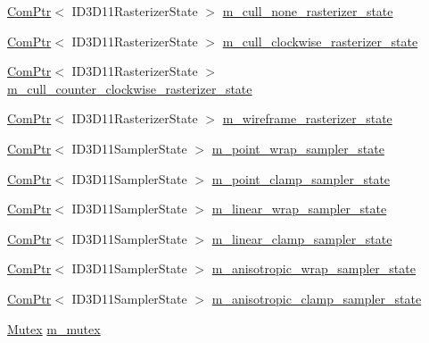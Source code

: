 \begin{DoxyCompactItemize}
\item 
\hyperlink{namespacemage_ae74f374780900893caa5555d1031fd79}{Com\+Ptr}$<$ I\+D3\+D11\+Rasterizer\+State $>$ \hyperlink{structmage_1_1_rendering_state_cache_a3801dbdf6386c9534123d695cbde47c7}{m\+\_\+cull\+\_\+none\+\_\+rasterizer\+\_\+state}
\item 
\hyperlink{namespacemage_ae74f374780900893caa5555d1031fd79}{Com\+Ptr}$<$ I\+D3\+D11\+Rasterizer\+State $>$ \hyperlink{structmage_1_1_rendering_state_cache_a4194ce92cb7cccd2ae219e13eaf7cfdc}{m\+\_\+cull\+\_\+clockwise\+\_\+rasterizer\+\_\+state}
\item 
\hyperlink{namespacemage_ae74f374780900893caa5555d1031fd79}{Com\+Ptr}$<$ I\+D3\+D11\+Rasterizer\+State $>$ \hyperlink{structmage_1_1_rendering_state_cache_a825b91a2cb5ab76375d1ebebe7a0ef74}{m\+\_\+cull\+\_\+counter\+\_\+clockwise\+\_\+rasterizer\+\_\+state}
\item 
\hyperlink{namespacemage_ae74f374780900893caa5555d1031fd79}{Com\+Ptr}$<$ I\+D3\+D11\+Rasterizer\+State $>$ \hyperlink{structmage_1_1_rendering_state_cache_a2fddb539c6cb42feb3c54b73ad2fe800}{m\+\_\+wireframe\+\_\+rasterizer\+\_\+state}
\item 
\hyperlink{namespacemage_ae74f374780900893caa5555d1031fd79}{Com\+Ptr}$<$ I\+D3\+D11\+Sampler\+State $>$ \hyperlink{structmage_1_1_rendering_state_cache_ae4011d6ce5effbacf3fd69ffa5d46ebc}{m\+\_\+point\+\_\+wrap\+\_\+sampler\+\_\+state}
\item 
\hyperlink{namespacemage_ae74f374780900893caa5555d1031fd79}{Com\+Ptr}$<$ I\+D3\+D11\+Sampler\+State $>$ \hyperlink{structmage_1_1_rendering_state_cache_ad53e96f5527120d6cfed5a4759dc0d41}{m\+\_\+point\+\_\+clamp\+\_\+sampler\+\_\+state}
\item 
\hyperlink{namespacemage_ae74f374780900893caa5555d1031fd79}{Com\+Ptr}$<$ I\+D3\+D11\+Sampler\+State $>$ \hyperlink{structmage_1_1_rendering_state_cache_a7f7289f3759840045dbe3dd2785199a8}{m\+\_\+linear\+\_\+wrap\+\_\+sampler\+\_\+state}
\item 
\hyperlink{namespacemage_ae74f374780900893caa5555d1031fd79}{Com\+Ptr}$<$ I\+D3\+D11\+Sampler\+State $>$ \hyperlink{structmage_1_1_rendering_state_cache_a8086db2af33ea844744f3e81a4471af6}{m\+\_\+linear\+\_\+clamp\+\_\+sampler\+\_\+state}
\item 
\hyperlink{namespacemage_ae74f374780900893caa5555d1031fd79}{Com\+Ptr}$<$ I\+D3\+D11\+Sampler\+State $>$ \hyperlink{structmage_1_1_rendering_state_cache_ac44316b27ee83a1aeb9f8afc26b5a743}{m\+\_\+anisotropic\+\_\+wrap\+\_\+sampler\+\_\+state}
\item 
\hyperlink{namespacemage_ae74f374780900893caa5555d1031fd79}{Com\+Ptr}$<$ I\+D3\+D11\+Sampler\+State $>$ \hyperlink{structmage_1_1_rendering_state_cache_a56467ab3877bfb1fa547efe4e4a62cc7}{m\+\_\+anisotropic\+\_\+clamp\+\_\+sampler\+\_\+state}
\item 
\hyperlink{structmage_1_1_mutex}{Mutex} \hyperlink{structmage_1_1_rendering_state_cache_a97aad58b39eedbeeb27ed47c87ded52a}{m\+\_\+mutex}
\end{DoxyCompactItemize}


